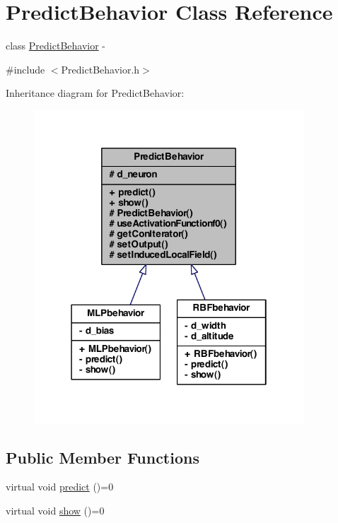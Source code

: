 \hypertarget{class_predict_behavior}{
\section{PredictBehavior Class Reference}
\label{class_predict_behavior}
}


class \hyperlink{class_predict_behavior}{PredictBehavior} -\/  




{\ttfamily \#include $<$PredictBehavior.h$>$}



Inheritance diagram for PredictBehavior:\nopagebreak
\begin{figure}[H]
\begin{center}
\leavevmode
\includegraphics[width=286pt]{class_predict_behavior__inherit__graph}
\end{center}
\end{figure}
\subsection*{Public Member Functions}
\begin{DoxyCompactItemize}
\item 
virtual void \hyperlink{class_predict_behavior_a7db41238d6d1dbf60c67cf8575e79885}{predict} ()=0
\item 
virtual void \hyperlink{class_predict_behavior_a9ef84360f73784248d994fa4707c1dde}{show} ()=0
\end{DoxyCompactItemize}
